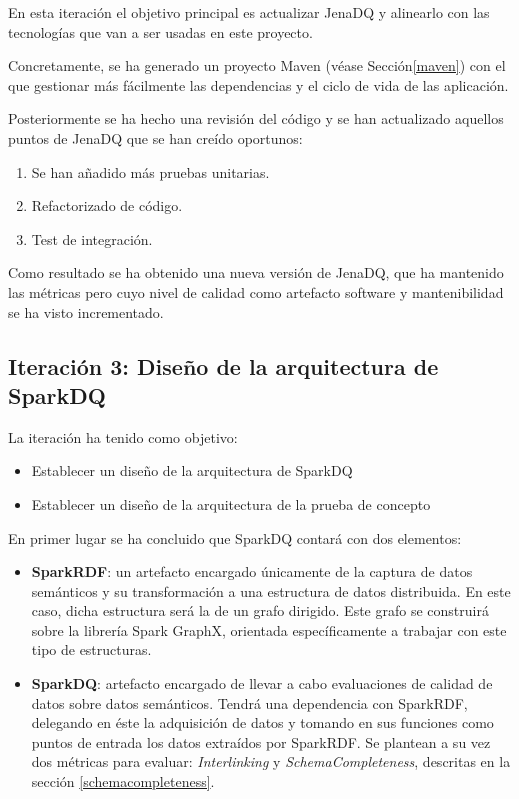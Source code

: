 

En esta iteración el objetivo principal es actualizar JenaDQ y alinearlo con las
tecnologías que van a ser usadas en este proyecto.

Concretamente, se ha generado
un proyecto Maven (véase Sección\ref{maven}) con el que gestionar más fácilmente
las dependencias y el ciclo de vida de las aplicación.

Posteriormente se ha hecho una revisión del código y se han actualizado aquellos
puntos de JenaDQ que se han creído oportunos:

\begin{enumerate}
\item Se han añadido más pruebas unitarias.
\item Refactorizado de código.
\item Test de integración.
\end{enumerate}

Como resultado se ha obtenido una nueva versión de JenaDQ, que ha mantenido las
métricas pero cuyo nivel de calidad como artefacto software y mantenibilidad se
ha visto incrementado.

\subsection{Iteración 3: Diseño de la arquitectura de SparkDQ}
\label{iteracion3}


La iteración ha tenido como objetivo:

\begin{itemize}
\item Establecer un diseño de la arquitectura de SparkDQ
\item Establecer un diseño de la arquitectura de la prueba de concepto
\end{itemize}

En primer lugar se ha concluido que SparkDQ contará con dos elementos:
\begin{itemize}
\item \textbf{SparkRDF}: un artefacto encargado únicamente de la captura de datos
  semánticos y su transformación a una estructura de datos distribuida. En este
  caso, dicha estructura será la de un grafo dirigido. Este grafo se construirá
  sobre la librería Spark GraphX, orientada específicamente a trabajar con este
  tipo de estructuras.
  \item \textbf{SparkDQ}: artefacto encargado de llevar a cabo evaluaciones de
    calidad de datos sobre datos semánticos. Tendrá una dependencia con
    SparkRDF, delegando en éste la adquisición de datos y tomando en sus
    funciones como puntos de entrada los datos extraídos por SparkRDF. Se
    plantean a su vez dos métricas para evaluar: \textit{Interlinking} y
    \textit{SchemaCompleteness}, descritas en la sección \ref{schemacompleteness}. 
\end{itemize}


